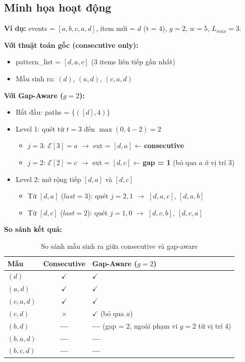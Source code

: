 \documentclass[14pt,a4paper,oneside]{extreport}
\begin{document}
\subsection{Minh họa hoạt động}

\textbf{Ví dụ:} events = $[a, b, c, a, d]$, item mới = $d$ (t = 4), $g = 2$, $w = 5$, $L_{max} = 3$.

\textbf{Với thuật toán gốc (consecutive only):}
\begin{itemize}
    \item pattern\_list = $[d, a, c]$ (3 items liên tiếp gần nhất)
    \item Mẫu sinh ra: $(d)$, $(a, d)$, $(c, a, d)$
\end{itemize}

\textbf{Với Gap-Aware ($g = 2$):}
\begin{itemize}
    \item Bắt đầu: paths = $\{([d], 4)\}$
    \item Level 1: quét từ $t=3$ đến $\max(0, 4-2) = 2$
    \begin{itemize}
        \item $j = 3$: $\mathcal{E}[3] = a$ $\rightarrow$ ext = $[d, a]$ ← \textbf{consecutive}
        \item $j = 2$: $\mathcal{E}[2] = c$ $\rightarrow$ ext = $[d, c]$ ← \textbf{gap = 1} (bỏ qua $a$ ở vị trí 3)
    \end{itemize}
    \item Level 2: mở rộng tiếp $[d, a]$ và $[d, c]$
    \begin{itemize}
        \item Từ $[d, a]$ ($\textit{last}=3$): quét $j=2,1$ $\rightarrow$ $[d, a, c]$, $[d, a, b]$
        \item Từ $[d, c]$ ($\textit{last}=2$): quét $j=1,0$ $\rightarrow$ $[d, c, b]$, $[d, c, a]$
    \end{itemize}
\end{itemize}

\textbf{So sánh kết quả:}
\begin{table}[H]
    \centering
    \caption{So sánh mẫu sinh ra giữa consecutive và gap-aware}
    \label{tab:gap_compare}
    \begin{tabular}{lcl}
        \toprule
        \textbf{Mẫu} & \textbf{Consecutive} & \textbf{Gap-Aware ($g=2$)} \\
        \midrule
        $(d)$       & $\checkmark$ & $\checkmark$ \\
        $(a, d)$    & $\checkmark$ & $\checkmark$ \\
        $(c, a, d)$ & $\checkmark$ & $\checkmark$ \\
        $(c, d)$    & $\times$ & $\checkmark$ (bỏ qua $a$) \\
        $(b, d)$    & \textbf{---} & \textbf{---} (gap = 2, ngoài phạm vi $g=2$ từ vị trí 4) \\
        $(b, a, d)$ & \textbf{---} & \textbf{---} \\
        $(b, c, d)$ & \textbf{---} & \textbf{---} \\
        \bottomrule
    \end{tabular}
\end{table}
\end{document}
